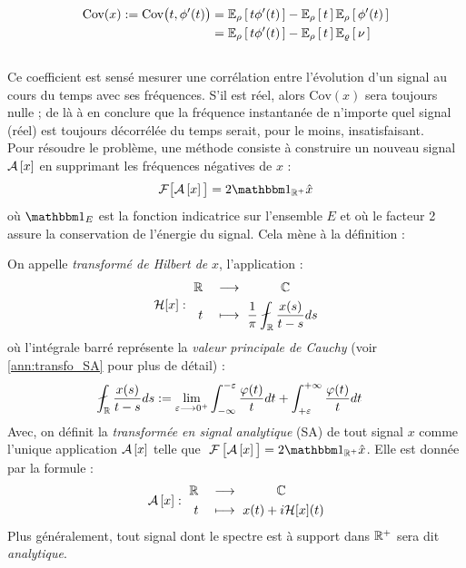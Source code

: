 \begin{align*}
	\text{Cov}(x) \defeq \text{Cov}\big(t,\phi'(t) \big) 
	&= \esp[\densit]{t\phi'(t)} - \esp[\densit]{t} \esp[\densit]{\phi'(t)} \\
	&= \esp[\densit]{t\phi'(t)} - \esp[\densit]{t} \esp[\densis]{\nu}	
\end{align*}
\\
Ce coefficient est sensé mesurer une corrélation entre l'évolution d'un signal au cours du temps avec ses fréquences. S'il est réel, alors  $\text{Cov}(x)$ sera toujours nulle ; de là à en conclure que la fréquence instantanée de n'importe quel signal (réel) est toujours décorrélée du temps serait, pour le moins, insatisfaisant.
\\

Pour résoudre le problème, une méthode consiste à construire un nouveau signal $\SA{x}$ en supprimant les fréquences négatives de $x$ :
\[\mathcal{F}\big[\SA{x}\big] = 2\one_{\R^+}\fou{x}\]
où $\one_E$ est la fonction indicatrice sur l'ensemble $E$ et où le facteur 2 assure la conservation de l'énergie du signal. Cela mène à la définition :

\begin{definition}\label{def:transfo_sa&hilbert}
	On appelle \emph{transformé de Hilbert de} $x$, l'application :
	\begin{equation}\label{eq:transfo_Hilb}
		\mathcal{H}[x] :\ \begin{aligned} 
			\R \quad &\lr\qquad\quad \C \\	
			t\quad &\longmapsto\ \frac{1}{\pi}\fint_\R \frac{x(s)}{t-s}ds %
		\end{aligned}
	\end{equation}
	où l'intégrale barré représente la \emph{valeur principale de Cauchy} (voir \cref{ann:transfo_SA} pour plus de détail) :
	\begin{align*}
		\fint_\R \frac{x(s)}{t-s}ds &\defeq \lim_{\varepsilon\lr0^+} \int_{-\infty}^{-\varepsilon} \frac{\varphi(t)}{t}dt + \int_{+\varepsilon}^{+\infty} \frac{\varphi(t)}{t}dt 
	\end{align*}
	Avec, on définit la \emph{transformée en signal analytique} (SA) de tout signal $x$ comme l'unique application $\SA{x}$ telle que $\ \Fou{\SA{x}\big.}= 2\one_{\R^+}\fou{x}$. Elle est donnée par la formule :
	\begin{equation}\label{eq:transfo_SA}
		\SA{x} :\ \begin{aligned} 
			\R \quad &\lr\qquad\quad \C \\	
			t\quad &\longmapsto\ x(t) + i\mathcal{H}[x](t) %
		\end{aligned}
	\end{equation}
	Plus généralement, tout signal dont le spectre est à support dans $\R^+$ sera dit \emph{analytique}.
\end{definition}
\skipl

